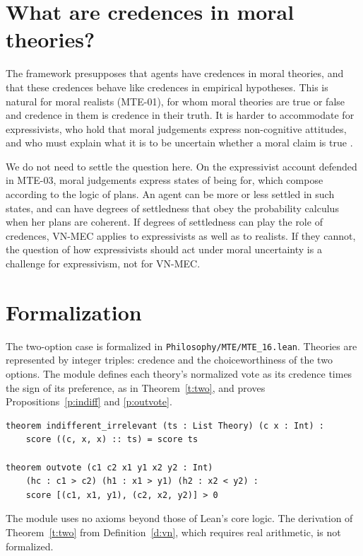 \documentclass{situationist-preprint}
\begin{document}
\section{What are credences in moral theories?}

The framework presupposes that agents have credences in moral theories, and that these credences behave like credences in empirical hypotheses. This is natural for moral realists (MTE-01), for whom moral theories are true or false and credence in them is credence in their truth. It is harder to accommodate for expressivists, who hold that moral judgements express non-cognitive attitudes, and who must explain what it is to be uncertain whether a moral claim is true \citep{Smith2002,BykvistOlson2009}.

We do not need to settle the question here. On the expressivist account defended in MTE-03, moral judgements express states of being for, which compose according to the logic of plans. An agent can be more or less settled in such states, and can have degrees of settledness that obey the probability calculus when her plans are coherent. If degrees of settledness can play the role of credences, VN-MEC applies to expressivists as well as to realists. If they cannot, the question of how expressivists should act under moral uncertainty is a challenge for expressivism, not for VN-MEC.

\section{Formalization}

The two-option case is formalized in \nolinkurl{Philosophy/MTE/MTE_16.lean}. Theories are represented by integer triples: credence and the choiceworthiness of the two options. The module defines each theory's normalized vote as its credence times the sign of its preference, as in Theorem~\ref{t:two}, and proves Propositions~\ref{p:indiff} and \ref{p:outvote}.

\begin{lstlisting}
theorem indifferent_irrelevant (ts : List Theory) (c x : Int) :
    score ((c, x, x) :: ts) = score ts

theorem outvote (c1 c2 x1 y1 x2 y2 : Int)
    (hc : c1 > c2) (h1 : x1 > y1) (h2 : x2 < y2) :
    score [(c1, x1, y1), (c2, x2, y2)] > 0
\end{lstlisting}

The module uses no axioms beyond those of Lean's core logic. The derivation of Theorem~\ref{t:two} from Definition~\ref{d:vn}, which requires real arithmetic, is not formalized.
\end{document}
